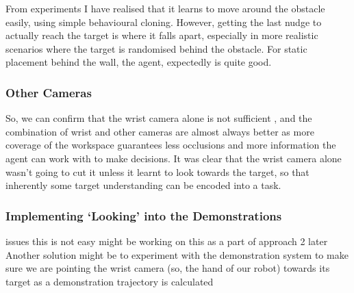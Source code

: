 
From experiments I have realised that it learns to move around the obstacle easily, using simple behavioural cloning. However, getting the last nudge to actually reach the target is where it falls apart, especially in more realistic scenarios where the target is randomised behind the obstacle. For static placement behind the wall, the agent, expectedly is quite good. 

\subsubsection{Other Cameras}
So, we can confirm that the wrist camera alone is not sufficient , and the combination of wrist and other cameras are almost always better as more coverage of the workspace guarantees less occlusions and more information the agent can work with to make decisions. It was clear that the wrist camera alone wasn't going to cut it unless it learnt to look towards the target, so that inherently some target understanding can be encoded into a task.




\subsubsection{Implementing `Looking' into the Demonstrations}\label{ew-looking-at-target}
issues this is not easy might be working on this as a part of approach 2 later
Another solution might be to experiment with the demonstration system to make sure we are pointing the wrist camera (so, the hand of our robot) towards its target as a demonstration trajectory is calculated 

